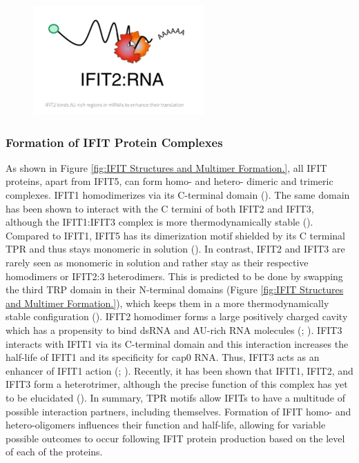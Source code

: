 \begin{figure}
    \centering
    \includegraphics[width=0.25\linewidth]{04. Introduction//Figs/04. IFIT2-rna-binding.png}
    
    
\end{figure}




\subsubsection{Formation of IFIT Protein Complexes} \label{Formation of IFIT Protein Complexes}
As shown in Figure \ref{fig:IFIT Structures and Multimer Formation.}, all IFIT proteins, apart from IFIT5, can form homo- and hetero- dimeric and trimeric complexes. IFIT1 homodimerizes via its C-terminal domain (\cite{Abbas2013StructuralProteins}). The same domain has been shown to interact with the C termini of both IFIT2 and IFIT3, although the IFIT1:IFIT3 complex is more thermodynamically stable (\cite{Fleith2018IFIT3RNA}). Compared to IFIT1, IFIT5 has its dimerization motif shielded by its C terminal TPR and thus stays monomeric in solution (\cite{Kumar2014InhibitionMRNAs}). In contrast, IFIT2 and IFIT3 are rarely seen as monomeric in solution and rather stay as their respective homodimers or IFIT2:3 heterodimers. This is predicted to be done by swapping the third TRP domain in their N-terminal domains (Figure \ref{fig:IFIT Structures and Multimer Formation.}), which keeps them in a more thermodynamically stable configuration (\cite{Yang2012CrystalMechanisms}). IFIT2 homodimer forms a large positively charged cavity which has a propensity to bind dsRNA and AU-rich RNA molecules (\cite{Vladimer2014IFITs:Proteins}; \cite{Yang2012CrystalMechanisms}). IFIT3 interacts with IFIT1 via its C-terminal domain and this interaction increases the half-life of IFIT1 and its specificity for cap0 RNA. Thus, IFIT3 acts as an enhancer of IFIT1 action (\cite{Fleith2018IFIT3RNA}; \cite{Johnson2018HumanStability}). Recently, it has been shown that IFIT1, IFIT2, and IFIT3 form a heterotrimer, although the precise function of this complex has yet to be elucidated (\cite{Fleith2018IFIT3RNA}). In summary, TPR motifs allow IFITs to have a multitude of possible interaction partners, including themselves. Formation of IFIT homo- and hetero-oligomers influences their function and half-life, allowing for variable possible outcomes to occur following IFIT protein production based on the level of each of the proteins. 

